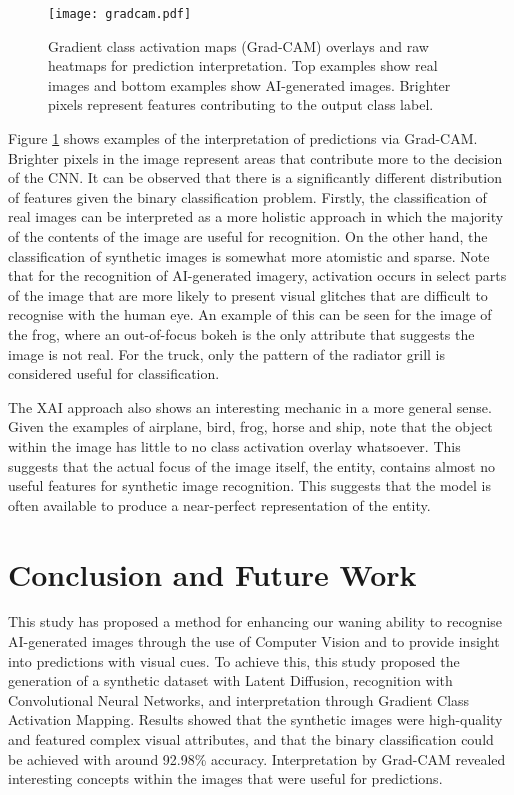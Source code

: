 \documentclass{article}
\begin{document}
\begin{figure}
    \centering
    \texttt{[image: gradcam.pdf]}
    \caption{Gradient class activation maps (Grad-CAM) overlays and raw heatmaps for prediction interpretation. Top examples show real images and bottom examples show AI-generated images. Brighter pixels represent features contributing to the output class label.}
    \label{fig:gradcam}
\end{figure}

Figure \ref{fig:gradcam} shows examples of the interpretation of predictions via Grad-CAM. Brighter pixels in the image represent areas that contribute more to the decision of the CNN. It can be observed that there is a significantly different distribution of features given the binary classification problem. Firstly, the classification of real images can be interpreted as a more holistic approach in which the majority of the contents of the image are useful for recognition. On the other hand, the classification of synthetic images is somewhat more atomistic and sparse. Note that for the recognition of AI-generated imagery, activation occurs in select parts of the image that are more likely to present visual glitches that are difficult to recognise with the human eye. An example of this can be seen for the image of the frog, where an out-of-focus bokeh is the only attribute that suggests the image is not real. For the truck, only the pattern of the radiator grill is considered useful for classification. 

The XAI approach also shows an interesting mechanic in a more general sense. Given the examples of airplane, bird, frog, horse and ship, note that the object within the image has little to no class activation overlay whatsoever. This suggests that the actual focus of the image itself, the entity, contains almost no useful features for synthetic image recognition. This suggests that the model is often available to produce a near-perfect representation of the entity. 



\section{Conclusion and Future Work}
\label{sec:conclusion}
This study has proposed a method for enhancing our waning ability to recognise AI-generated images through the use of Computer Vision and to provide insight into predictions with visual cues. To achieve this, this study proposed the generation of a synthetic dataset with Latent Diffusion, recognition with Convolutional Neural Networks, and interpretation through Gradient Class Activation Mapping. Results showed that the synthetic images were high-quality and featured complex visual attributes, and that the binary classification could be achieved with around 92.98\% accuracy. Interpretation by Grad-CAM revealed interesting concepts within the images that were useful for predictions.
\end{document}
